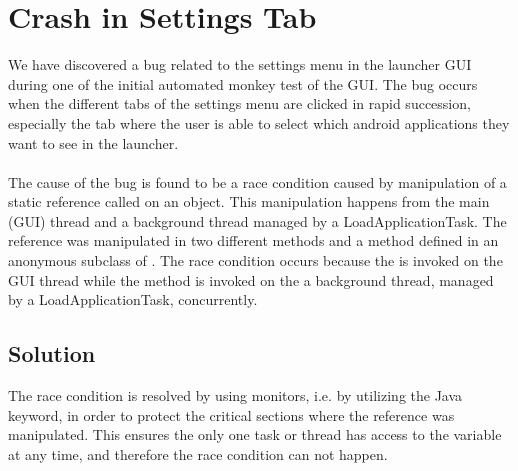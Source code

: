 \section{Crash in Settings Tab}
\label{sec:crash_in_settings_tab}

We have discovered a bug related to the settings menu in the launcher GUI during one of the initial automated monkey test of the GUI. The bug occurs when the different tabs of the settings menu are clicked in rapid succession, especially the tab where the user is able to select which android applications they want to see in the \giraf launcher.
\\\\
The cause of the bug is found to be a race condition caused by manipulation of a static reference called  on an  object. This manipulation happens from the main (GUI) thread and a background thread managed by a LoadApplicationTask. The reference was manipulated in two different methods  and a method  defined in an anonymous subclass of . The race condition occurs because the  is invoked on the GUI thread while the  method is invoked on the a background thread, managed by a LoadApplicationTask, concurrently.   

\subsection{Solution}
\label{sub:crash_in_settings_tab_solution}
The race condition is resolved by using monitors, i.e. by utilizing the  Java keyword, in order to protect the critical sections where the  reference was manipulated. This ensures the only one task or thread has access to the variable at any time, and therefore the race condition can not happen.



